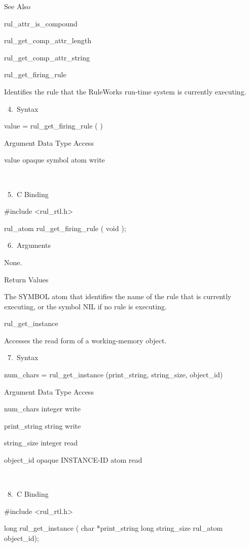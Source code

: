           See Also

          rul_attr_is_compound

          rul_get_comp_attr_length

          rul_get_comp_attr_string

          rul_get_firing_rule

          Identifies the rule that the
          RuleWorks run-time system is
          currently executing.

       4. Syntax

          value = rul_get_firing_rule ( )

          Argument  Data Type  Access

          value  opaque symbol atom  write

           

       5. C Binding

          #include <rul_rtl.h>

          rul_atom rul_get_firing_rule ( void
          );

       6. Arguments

          None.

          Return Values

          The SYMBOL atom that identifies the
          name of the rule that is currently
          executing, or the symbol NIL if no
          rule is executing.

          rul_get_instance

          Accesses the read form of a
          working-memory object.

       7. Syntax

          num_chars = rul_get_instance
          (print_string, string_size,
          object_id)

          Argument  Data Type     Access

          num_chars  integer     write

          print_string  string     write

          string_size  integer     read

          object_id  opaque INSTANCE-ID atom
           read

           

       8. C Binding

          #include <rul_rtl.h>

          long rul_get_instance (
          char *print_string
          long string_size
          rul_atom object_id);

